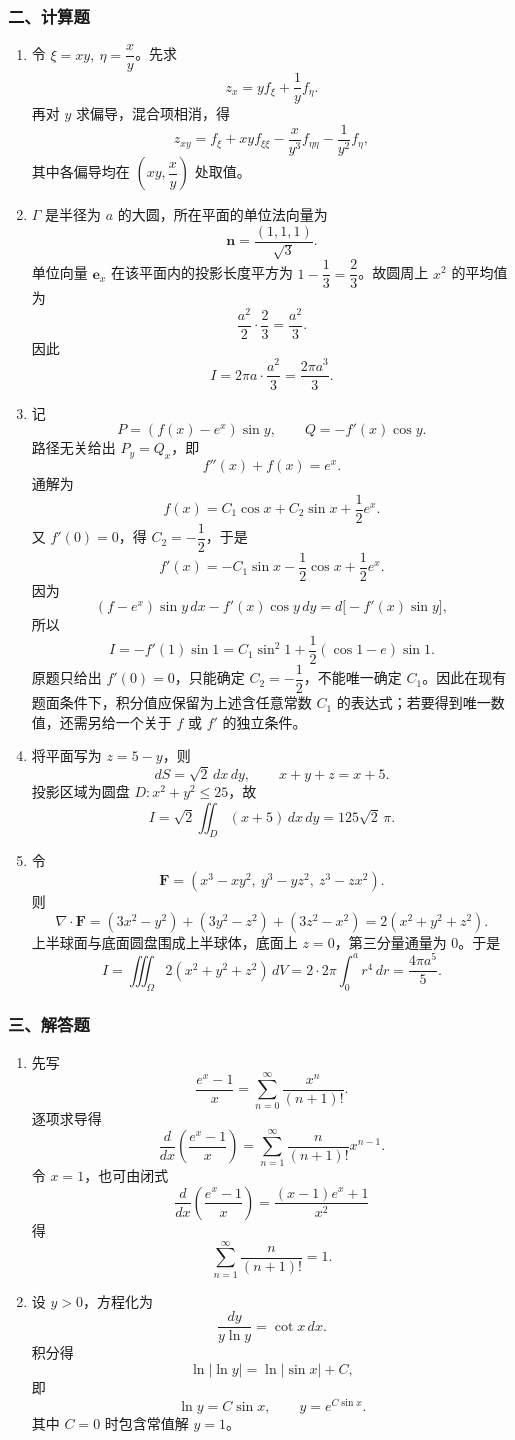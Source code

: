 \subsubsection*{二、计算题}
\begin{enumerate}
  \item 令 $\xi=xy,\ \eta=\dfrac{x}{y}$。先求
  \[
  z_x=yf_\xi+\frac1y f_\eta.
  \]
  再对 $y$ 求偏导，混合项相消，得
  \[
  z_{xy}=f_\xi+xyf_{\xi\xi}-\frac{x}{y^3}f_{\eta\eta}-\frac1{y^2}f_\eta,
  \]
  其中各偏导均在 $\left(xy,\dfrac{x}{y}\right)$ 处取值。
  \item $\Gamma$ 是半径为 $a$ 的大圆，所在平面的单位法向量为
  \[
  \mathbf n=\frac{(1,1,1)}{\sqrt3}.
  \]
  单位向量 $\mathbf e_x$ 在该平面内的投影长度平方为 $1-\dfrac13=\dfrac23$。故圆周上 $x^2$ 的平均值为
  \[
  \frac{a^2}{2}\cdot\frac23=\frac{a^2}{3}.
  \]
  因此
  \[
  I=2\pi a\cdot\frac{a^2}{3}=\frac{2\pi a^3}{3}.
  \]
  \item 记
  \[
  P=(f(x)-e^x)\sin y,\qquad Q=-f'(x)\cos y.
  \]
  路径无关给出 $P_y=Q_x$，即
  \[
  f''(x)+f(x)=e^x.
  \]
  通解为
  \[
  f(x)=C_1\cos x+C_2\sin x+\frac12e^x.
  \]
  又 $f'(0)=0$，得 $C_2=-\dfrac12$，于是
  \[
  f'(x)=-C_1\sin x-\frac12\cos x+\frac12e^x.
  \]
  因为
  \[
  (f-e^x)\sin y\,dx-f'(x)\cos y\,dy=d\bigl[-f'(x)\sin y\bigr],
  \]
  所以
  \[
  I=-f'(1)\sin1
  =C_1\sin^2 1+\frac12(\cos1-e)\sin1.
  \]
  原题只给出 $f'(0)=0$，只能确定 $C_2=-\dfrac12$，不能唯一确定 $C_1$。因此在现有题面条件下，积分值应保留为上述含任意常数 $C_1$ 的表达式；若要得到唯一数值，还需另给一个关于 $f$ 或 $f'$ 的独立条件。
  \item 将平面写为 $z=5-y$，则
  \[
  dS=\sqrt2\,dx\,dy,\qquad x+y+z=x+5.
  \]
  投影区域为圆盘 $D:x^2+y^2\le25$，故
  \[
  I=\sqrt2\iint_D(x+5)\,dx\,dy
  =125\sqrt2\,\pi.
  \]
  \item 令
  \[
  \mathbf F=(x^3-xy^2,\ y^3-yz^2,\ z^3-zx^2).
  \]
  则
  \[
  \nabla\cdot\mathbf F
  =(3x^2-y^2)+(3y^2-z^2)+(3z^2-x^2)
  =2(x^2+y^2+z^2).
  \]
  上半球面与底面圆盘围成上半球体，底面上 $z=0$，第三分量通量为 $0$。于是
  \[
  I=\iiint_\Omega 2(x^2+y^2+z^2)\,dV
  =2\cdot 2\pi\int_0^a r^4\,dr
  =\frac{4\pi a^5}{5}.
  \]
\end{enumerate}

\subsubsection*{三、解答题}
\begin{enumerate}
  \item 先写
  \[
  \frac{e^x-1}{x}=\sum_{n=0}^{\infty}\frac{x^n}{(n+1)!}.
  \]
  逐项求导得
  \[
  \frac{d}{dx}\left(\frac{e^x-1}{x}\right)
  =\sum_{n=1}^{\infty}\frac{n}{(n+1)!}x^{n-1}.
  \]
  令 $x=1$，也可由闭式
  \[
  \frac{d}{dx}\left(\frac{e^x-1}{x}\right)
  =\frac{(x-1)e^x+1}{x^2}
  \]
  得
  \[
  \sum_{n=1}^{\infty}\frac{n}{(n+1)!}=1.
  \]
  \item 设 $y>0$，方程化为
  \[
  \frac{dy}{y\ln y}=\cot x\,dx.
  \]
  积分得
  \[
  \ln|\ln y|=\ln|\sin x|+C,
  \]
  即
  \[
  \ln y=C\sin x,\qquad y=e^{C\sin x}.
  \]
  其中 $C=0$ 时包含常值解 $y=1$。
\end{enumerate}

